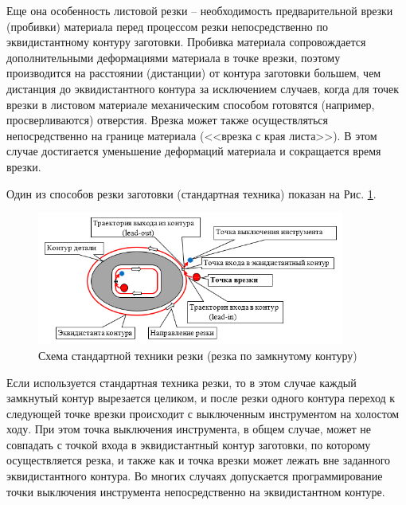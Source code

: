 \documentclass[11pt,twoside]{report}
\begin{document}
Еще она особенность листовой резки –
необходимость предварительной врезки (пробивки)
материала перед процессом резки непосредственно
по эквидистантному контуру заготовки.
Пробивка материала сопровождается дополнительными
деформациями материала в точке врезки,
поэтому производится на расстоянии (дистанции)
от контура заготовки большем,
чем дистанция до эквидистантного контура за исключением случаев,
когда для точек врезки в листовом материале механическим способом
готовятся (например, просверливаются)
отверстия.
Врезка может также осуществляться
непосредственно на границе материала
(<<врезка с края листа>>).
В этом случае достигается уменьшение
деформаций материала и сокращается время врезки.

Один из способов резки заготовки (стандартная техника)
показан на Рис. \ref{standard-cutting}.

\begin{figure}
  \begin{center}
  \includegraphics[width=0.9\textwidth]{cutting-path.png}
  \caption{Схема стандартной техники резки (резка по замкнутому контуру)}
  \label{standard-cutting}
  \end{center}
\end{figure}

Если используется стандартная техника резки,
то в этом случае каждый замкнутый контур вырезается целиком,
и после резки одного контура переход к следующей точке врезки
происходит с выключенным инструментом на холостом ходу.
При этом точка выключения инструмента, в общем случае,
может не совпадать с точкой входа в эквидистантный контур заготовки,
по которому осуществляется резка, и также как и точка врезки
может лежать вне заданного эквидистантного контура.
Во многих случаях допускается программирование точки выключения
инструмента непосредственно на эквидистантном контуре.
\end{document}

